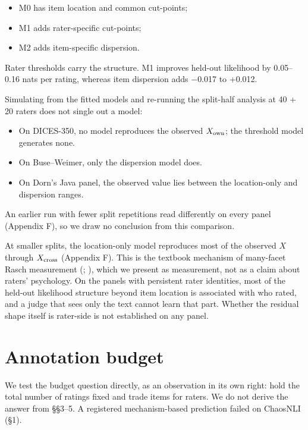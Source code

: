 \documentclass[10pt,twocolumn]{article}
\providecommand{\tightlist}{\setlength{\itemsep}{0pt}\setlength{\parskip}{0pt}}
\begin{document}
\begin{itemize}
\tightlist
\item
  M0 has item location and common cut-points;
\item
  M1 adds rater-specific cut-points;
\item
  M2 adds item-specific dispersion.
\end{itemize}

Rater thresholds carry the structure. M1 improves held-out likelihood by 0.05--0.16 nats per rating, whereas item dispersion adds $-$0.017 to +0.012.

Simulating from the fitted models and re-running the split-half analysis at 40 + 20 raters does not single out a model:

\begin{itemize}
\tightlist
\item
  On DICES-350, no model reproduces the observed \(X_{\rm own}\); the threshold model generates none.
\item
  On Buse--Weimer, only the dispersion model does.
\item
  On Dorn's Java panel, the observed value lies between the location-only and dispersion ranges.
\end{itemize}

An earlier run with fewer split repetitions read differently on every panel (Appendix F), so we draw no conclusion from this comparison.

At smaller splits, the location-only model reproduces most of the observed \(X\) through \(X_{\rm cross}\) (Appendix F). This is the textbook mechanism of many-facet Rasch measurement (\citealp{linacre1989mfrm}; \citealp{eckes2011mfrm}), which we present as measurement, not as a claim about raters' psychology. On the panels with persistent rater identities, most of the held-out likelihood structure beyond item location is associated with who rated, and a judge that sees only the text cannot learn that part. Whether the residual shape itself is rater-side is not established on any panel.

\section{Annotation budget}


We test the budget question directly, as an observation in its own right: hold the total number of ratings fixed and trade items for raters. We do not derive the answer from \S{}\S{}3--5. A registered mechanism-based prediction failed on ChaosNLI (\S{}1).
\end{document}
